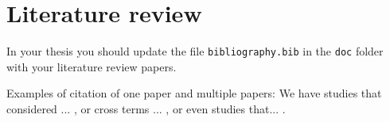 \chapter{Literature review} \label{chap:lit}

In your thesis you should update the file \texttt{bibliography.bib} in the \texttt{doc} folder with your literature review papers.

Examples of citation of one paper and multiple papers: We have studies that considered ... \cite{doe0000}, or cross terms ... \cite{doe0000}, or even studies that... \cite{doe0000}.
